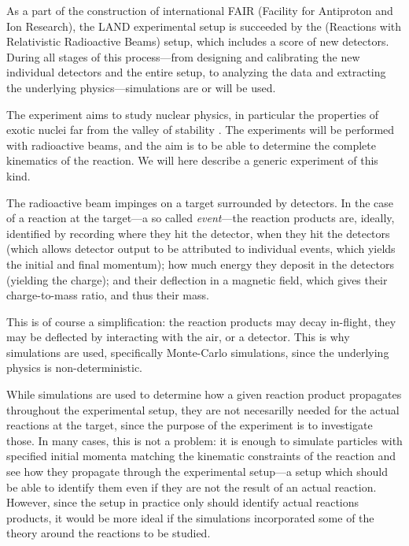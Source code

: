 As a part of the construction of international FAIR (Facility for Antiproton and Ion Research), the LAND experimental setup is succeeded by the \rtb{} (Reactions with Relativistic Radioactive Beams) setup, which includes a score of new detectors. During all stages of this process---from designing and calibrating the new individual detectors and the entire setup, to analyzing the data and extracting the underlying physics---simulations are or will be used. 

The \rtb{} experiment aims to study nuclear physics, in particular the properties of exotic nuclei far from the valley of stability \cite{r3b:online}. The experiments will be performed with radioactive beams, and the aim is to be able to determine the complete kinematics of the reaction. We will here describe a generic experiment of this kind.

The radioactive beam impinges on a target surrounded by detectors. In the case of a reaction at the target---a so called \emph{event}---the reaction products are, ideally, identified by recording where they hit the detector, when they hit the detectors (which allows detector output to be attributed to individual events, which yields the initial and final momentum); how much energy they deposit in the detectors (yielding the charge); and their deflection in a magnetic field, which gives their charge-to-mass ratio, and thus their mass. 

This is of course a simplification: the reaction products may decay in-flight, they may be deflected by interacting with the air, or a detector. This is why simulations are used, specifically Monte-Carlo simulations, since the underlying physics is non-deterministic. 

While simulations are used to determine how a given reaction product propagates throughout the experimental setup, they are not necesarilly needed for the actual reactions at the target, since the purpose of the experiment is to investigate those. 
In many cases, this is not a problem: it is enough to simulate particles with specified initial momenta matching the kinematic constraints of the reaction and see how they propagate through the experimental setup---a setup which should be able to identify them even if they are not the result of an actual reaction.
However, since the setup in practice only should identify actual reactions products, it would be more ideal if the simulations incorporated some of the theory around the reactions to be studied.

